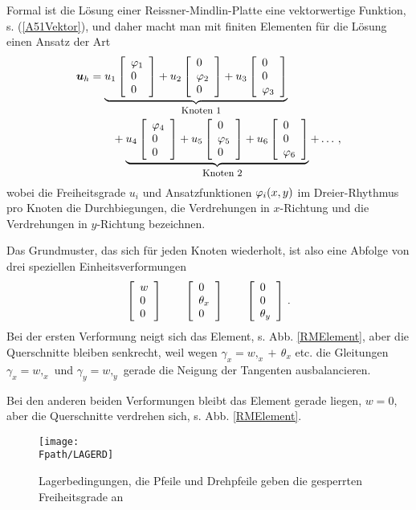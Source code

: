 Formal ist die L\"{o}sung einer Reissner-Mindlin-Platte eine vektorwertige Funktion, s. (\ref{A51Vektor}), und daher macht man mit finiten Elementen f\"{u}r die L\"{o}sung einen Ansatz
der Art
\begin{align}
\vek u_{h} &= \underbrace{u_1 \left [ \barr {l } \Np_1  \\ 0 \\ 0 \earr \right ] + u_2
\left [ \barr {l } 0 \\ \Np_2  \\ 0 \earr \right ] + u_3 \left [ \barr {l } 0 \\ 0 \\
\Np_3
\earr \right ]}_{\mbox{\small Knoten 1} }\\
&\qquad + \underbrace{u_4 \left [ \barr {l } \Np_4  \\ 0 \\ 0 \earr \right ] + u_5 \left [
\barr {l } 0 \\ \Np_5  \\ 0 \earr \right ] + u_6 \left [ \barr {l } 0 \\ 0 \\ \Np_6
\earr \right ]}_{\mbox{\small Knoten 2} } + \ldots\,,
\end{align}
wobei die Freiheitsgrade $u_i$ und Ansatzfunktionen $\Np_i(x,y)$ im Dreier-Rhythmus pro Knoten die Durchbiegungen, die Verdrehungen in $x$-Richtung und die Verdrehungen in $y$-Richtung bezeichnen.

Das Grundmuster, das sich f\"{u}r jeden Knoten wiederholt, ist also eine Abfolge von drei
speziellen Einheitsverformungen
\begin{align}
 \left [ \barr {l } w \\ 0 \\ 0 \earr \right ]
\qquad  \left [ \barr {l } 0 \\ \theta_x \\ 0 \earr \right ] \qquad   \left [ \barr {l }
0 \\ 0 \\ \theta_y \earr \right ] \,.
\end{align}
Bei der ersten Verformung neigt sich das Element, s. Abb. \ref{RMElement}, aber die Querschnitte bleiben senkrecht, weil wegen $\gamma_x = w,_x + \, \theta_x$ etc. die Gleitungen $\gamma_x = w,_x$ und $\gamma_y = w,_y$ gerade die Neigung der Tangenten ausbalancieren.

Bei den anderen beiden Verformungen bleibt das Element gerade liegen, $w = 0$, aber die Querschnitte verdrehen sich, s. Abb. \ref{RMElement}.
\begin{figure}[tbp]
\if {} \sidecaption \fi
\texttt{[image: \\Fpath/LAGERD]}
\caption{Lagerbedingungen, die Pfeile und Drehpfeile geben die gesperrten Freiheitsgrade
an} \label{LagerG}
\end{figure}%

